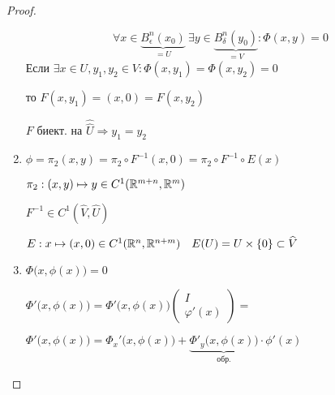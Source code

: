 \begin{proof}
\begin{enumerate}
                \[
                      \forall x \in \underbrace{B_\epsilon^n(x_0)}_{= U} \ \exists y \in \underbrace{B_\delta^n(y_0)}_{= V} : \Phi(x, y) = 0
                \]
                Если $\exists x \in U, y_1, y_2 \in V : \Phi(x, y_1) = \Phi(x, y_2) = 0$
                \par \quad то $F(x, y_1) = (x, 0) = F(x, y_2)$
                \par \quad \quad $F$ биект. на $\widehat{\widehat U} \Rightarrow y_1 = y_2$ %
            \item $\phi = \pi_2(x, y) = \pi_2 \circ F^{-1}(x, 0) = \pi_2 \circ F^{-1} \circ E(x)$
                \par $\pi_2 : (x, y) \mapsto y \in C^1(\mathbb{R}^{m+n}, \mathbb{R}^m)$
                \par $F^{-1} \in C^1(\widehat V, \widehat U)$
                \par $E  : x \mapsto (x, 0) \in C^1(\mathbb{R}^n, \mathbb{R}^{n+m}) \quad E(U) = U \times \{0\} \subset \widehat V$
            \item $\Phi\big(x, \phi(x)\big) = 0$
                \par $\Phi'\big(x, \phi(x)\big) = \Phi'\big(x, \phi(x)\big) \begin{pmatrix}
                    I \\ \varphi'(x)\end{pmatrix} = $ %
                \par $\Phi'\big(x, \phi(x)\big) = \Phi_x'\big(x, \phi(x)\big) + \underbrace{\Phi'_y\big(x, \phi(x)\big)}_{\text{обр.}} \cdot \phi'(x)$ 
        \end{enumerate}
    \end{proof}

